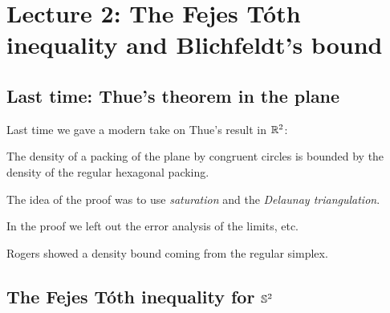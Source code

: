 \chapter{Lecture 2: The Fejes T\'oth inequality and Blichfeldt's bound}\label{L2:chap}

\section{Last time: Thue's theorem in the plane}\label{L2:sec:thue}
Last time we gave a modern take on Thue's result in $\mathbb{R}^2$:

\begin{theorem}[Thue]\label{L2:thm:thue}
The density of a packing of the plane by congruent circles is bounded by the density of the regular
hexagonal packing.
\end{theorem}

\begin{center}
\end{center}

The idea of the proof was to use \emph{saturation} and the \emph{Delaunay triangulation}.

\begin{remark}
In the proof we left out the error analysis of the limits, etc.
\end{remark}

\begin{remark}
Rogers showed a density bound coming from the regular simplex.
\end{remark}

\section{The Fejes T\'oth inequality for \texorpdfstring{$\mathbb{S}^2$}{S2}}\label{L2:sec:FT}

